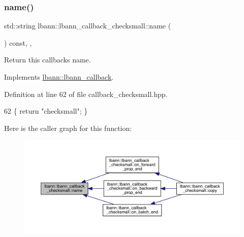 \subsubsection{\texorpdfstring{name()}{name()}}
{\footnotesize\ttfamily std\+::string lbann\+::lbann\+\_\+callback\+\_\+checksmall\+::name (\begin{DoxyParamCaption}{ }\end{DoxyParamCaption}) const\hspace{0.3cm}{\ttfamily [inline]}, {\ttfamily [override]}, {\ttfamily [virtual]}}

Return this callback\textquotesingle{}s name. 

Implements \hyperlink{classlbann_1_1lbann__callback_a7522c7a14f1d6a1ea762cc2d7248eb3a}{lbann\+::lbann\+\_\+callback}.



Definition at line 62 of file callback\+\_\+checksmall.\+hpp.


\begin{DoxyCode}
62 \{ \textcolor{keywordflow}{return} \textcolor{stringliteral}{"checksmall"}; \}
\end{DoxyCode}
Here is the caller graph for this function\+:\nopagebreak
\begin{figure}[H]
\begin{center}
\leavevmode
\includegraphics[width=350pt]{classlbann_1_1lbann__callback__checksmall_acbdd897ecbe5a27b59db15ae7662e0f9_icgraph}
\end{center}
\end{figure}
\mbox{\label{classlbann_1_1lbann__callback__checksmall_aade56a328c4b9df28c0cd979eed9e5ff}} 
